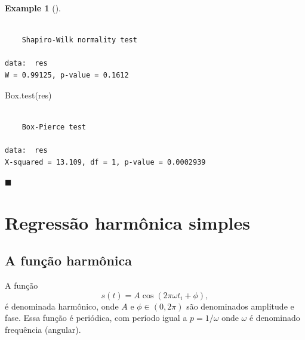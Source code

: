 \documentclass[
  letterpaper,
  DIV=11,
  numbers=noendperiod]{scrartcl}
\newenvironment{Shaded}{\begin{snugshade}}{\end{snugshade}}
\newcommand{\FunctionTok}[1]{\textcolor[rgb]{0.28,0.35,0.67}{#1}}
\newcommand{\NormalTok}[1]{\textcolor[rgb]{0.00,0.23,0.31}{#1}}
\theoremstyle{definition}
\newtheorem{example}{Example}[chapter]
\theoremstyle{definition}
\theoremstyle{plain}
\theoremstyle{plain}
\theoremstyle{remark}
\begin{document}
\begin{example}[]
\begin{verbatim}

    Shapiro-Wilk normality test

data:  res
W = 0.99125, p-value = 0.1612
\end{verbatim}

\begin{Shaded}
\begin{Highlighting}[]
\FunctionTok{Box.test}\NormalTok{(res)}
\end{Highlighting}
\end{Shaded}

\begin{verbatim}

    Box-Pierce test

data:  res
X-squared = 13.109, df = 1, p-value = 0.0002939
\end{verbatim}

\(\blacksquare\)

\end{example}

\section{Regressão harmônica
simples}\label{regressuxe3o-harmuxf4nica-simples}

\subsection{A função harmônica}\label{a-funuxe7uxe3o-harmuxf4nica}

A função \begin{equation}
    s(t) = A \cos\left( 2\pi \omega t_i +\phi \right),
\end{equation} é denominada harmônico, onde \(A\) e \(\phi\in(0,2\pi)\)
são denominados amplitude e fase. Essa função é periódica, com período
igual a \(p = 1/\omega\) onde \(\omega\) é denominado frequência
(angular).
\end{document}
